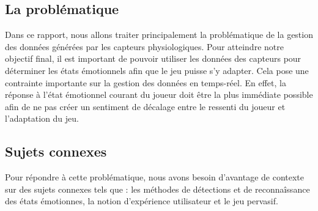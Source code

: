\documentclass{article}
\begin{document}
	\subsection{La problématique}
		Dans ce rapport, nous allons traiter principalement la problématique de la gestion des données générées par les capteurs physiologiques.
		Pour atteindre notre objectif final, il est important de pouvoir utiliser les données des capteurs pour déterminer les états émotionnels afin que le jeu puisse s'y adapter. Cela pose une contrainte importante sur la gestion des données en temps-réel.
		En effet, la réponse à l'état émotionnel courant du joueur doit être la plus immédiate possible afin de ne pas créer un sentiment de décalage entre le ressenti du joueur et l'adaptation du jeu.
	\subsection{Sujets connexes}
		Pour répondre à cette problématique, nous avons besoin d'avantage de contexte sur des sujets connexes tels que : les méthodes de détections et de reconnaîssance des états émotionnes, la notion d'expérience utilisateur et le jeu pervasif.
\end{document}
